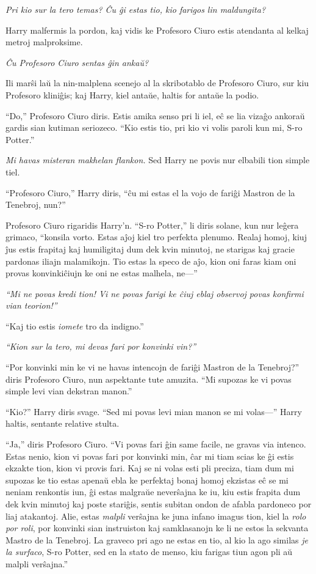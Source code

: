 \emph{Pri kio sur la tero temas? Ĉu ĝi estas tio, kio farigos lin
  maldungita?}

Harry malfermis la pordon, kaj vidis ke Profesoro Ciuro estis
atendanta al kelkaj metroj malproksime.

\emph{Ĉu Profesoro Ciuro sentas ĝin ankaŭ?}

Ili marŝi laŭ la nin-malplena scenejo al la skribotablo de Profesoro
Ciuro, sur kiu Profesoro kliniĝis; kaj Harry, kiel antaŭe, haltis for
antaŭe la podio.

``Do,'' Profesoro Ciuro diris. Estis amika senso pri li iel, eĉ se lia
vizaĝo ankoraŭ gardis sian kutiman seriozeco. ``Kio estis tio, pri kio
vi volis paroli kun mi, S-ro Potter.''

\emph{Mi havas misteran makhelan flankon.} Sed Harry ne povis nur
elbabili tion simple tiel.

``Profesoro Ciuro,'' Harry diris, ``ĉu mi estas el la vojo de fariĝi
Mastron de la Tenebroj, nun?''

Profesoro Ciuro rigaridis Harry'n. ``S-ro Potter,'' li diris solane,
kun nur leĝera grimaco, ``konsila vorto. Estas aĵoj kiel tro perfekta
plenumo. Realaj homoj, kiuj ĵus estis frapitaj kaj humiligitaj dum dek
kvin minutoj, ne starigas kaj gracie pardonas iliajn malamikojn. Tio
estas la speco de aĵo, kion oni faras kiam oni provas konvinkiĉiujn ke
oni ne estas malhela, ne—''

\emph{``Mi ne povas kredi tion! Vi ne povas farigi ke ĉiuj eblaj observoj
  povas konfirmi vian teorion!''}

``Kaj tio estis \emph{iomete} tro da indigno.''

\emph{``Kion sur la tero, mi devas fari por konvinki vin?''}

``Por konvinki min ke vi ne havas intencojn de fariĝi Mastron de la
Tenebroj?'' diris Profesoro Ciuro, nun aspektante tute amuzita. ``Mi
supozas ke vi povas simple levi vian dekstran manon.''

``Kio?'' Harry diris svage. ``Sed mi povas levi mian manon se mi
volas—'' Harry haltis, sentante relative stulta.

``Ja,'' diris Profesoro Ciuro. ``Vi povas fari ĝin same facile, ne
gravas via intenco. Estas nenio, kion vi povas fari por konvinki min,
ĉar mi tiam scias ke ĝi estis ekzakte tion, kion vi provis fari. Kaj
se ni volas esti pli preciza, tiam dum mi supozas ke tio estas apenaŭ
ebla ke perfektaj bonaj homoj ekzistas eĉ se mi neniam renkontis iun,
ĝi estas malgraŭe neverŝajna ke iu, kiu estis frapita dum dek kvin
minutoj kaj poste stariĝis, sentis subitan ondon de afabla pardoneco
por liaj atakantoj. Alie, estas \emph{malpli} verŝajna ke juna infano
imagus tion, kiel la \emph{rolo por roli}, por konvinki sian
instruiston kaj samklasanojn ke li ne estos la sekvanta Mastro de la
Tenebroj. La graveco pri ago ne estas en tio, al kio la ago similas
\emph{je la surfaco}, S-ro Potter, sed en la stato de menso, kiu
farigas tiun agon pli aŭ malpli verŝajna.''

